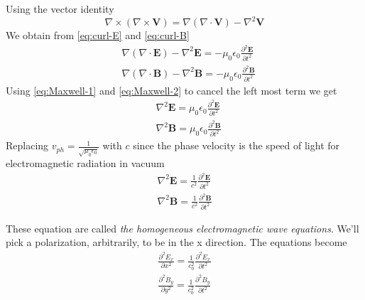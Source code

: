 Using the vector identity
\begin{equation}
    \nabla \times \left ( \nabla \times \mathbf{V} \right) = \nabla \left ( \nabla \cdot \mathbf{V} \right) - \nabla^2 \mathbf{V}
\end{equation}
We obtain from \ref{eq:curl-E} and \ref{eq:curl-B}
\begin{subequations}
    \begin{align}
        &\nabla (\nabla \cdot \mathbf{E}) - \nabla^2 \mathbf{E} 
        = -\mu_0\epsilon_0\frac{\partial^2 \mathbf{E}}{\partial t^2} \\
        &\nabla (\nabla \cdot \mathbf{B}) - \nabla^2 \mathbf{B} 
        = -\mu_0\epsilon_0\frac{\partial^2 \mathbf{B}}{\partial t^2}
    \end{align}
\end{subequations}
Using \ref{eq:Maxwell-1} and \ref{eq:Maxwell-2} to cancel the left most term we get
\begin{subequations}
    \begin{align}
        &\nabla^2 \mathbf{E} = \mu_0\epsilon_0\frac{\partial^2 \mathbf{E}}{\partial t^2}\\
        &\nabla^2 \mathbf{B} = \mu_0\epsilon_0\frac{\partial^2 \mathbf{B}}{\partial t^2}
    \end{align}
\end{subequations}
Replacing $v_{ph} = \frac{1}{\sqrt{\mu_0\epsilon_0}}$ with $c$ since the phase velocity is the speed of light for electromagnetic radiation in vacuum
\begin{equation} \label{eq:Homo_electro_wave}
    \begin{split}
        \nabla^2 \mathbf{E} = \frac{1}{c^2}\frac{\partial^2 \mathbf{E}}{\partial t^2} \\
        \nabla^2 \mathbf{B} = \frac{1}{c^2}\frac{\partial^2 \mathbf{B}}{\partial t^2}
    \end{split}
\end{equation}

These equation are called \textit{the homogeneous electromagnetic wave equations}.
We'll pick a polarization, arbitrarily, to be in the x direction. The equations become
\begin{equation} \label{eq:Homo_electro_wave_pol}
    \begin{split}
        \frac{\partial^2 E_x}{\partial x^2} = \frac{1}{c_0^2}\frac{\partial^2 E_x}{\partial t^2} \\
        \frac{\partial^2 B_y}{\partial y^2} = \frac{1}{c_0^2}\frac{\partial^2 B_y}{\partial t^2} 
    \end{split}
\end{equation}


